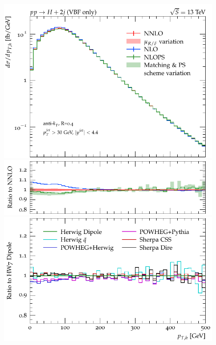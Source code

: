 \documentclass[10pt,prd,fleqn,superscriptaddress,notitlepage,nofootinbib,preprintnumbers,nobalancelastpage]{revtex4-1}
\begin{document}
\begin{figure}[tp]
  \centering
  \begin{minipage}{.295\textwidth}
    \includegraphics[width=\textwidth]{figures/tools/pth.pdf}
    \includegraphics[width=\textwidth]{figures/tools/pth_rFO.pdf}
    \includegraphics[width=\textwidth]{figures/tools/pth_rMC.pdf}
  \end{minipage}\hskip 1cm
  \begin{minipage}{.295\textwidth}

\end{minipage}
\end{figure}
\end{document}
